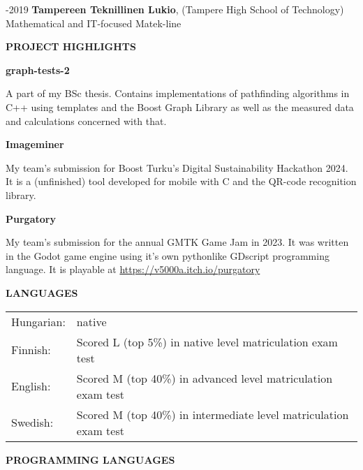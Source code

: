 \documentclass{article}
\begin{document}
-2019 \hspace{1.85cm}\textbf{Tampereen Teknillinen Lukio}, (Tampere High School of Technology) \newline
\hspace*{3.35cm} Mathematical and IT-focused Matek-line \newline

\vspace{1cm}
\textbf{\LARGE PROJECT HIGHLIGHTS}
\vspace{0.5cm}

\textbf{\large graph-tests-2}
\vspace{0.5cm}

\noindent A part of my BSc thesis. Contains implementations of pathfinding 
algorithms in C++ using templates and the Boost Graph Library as well as the 
measured data and calculations concerned with that.

\vspace{0.5cm}
\textbf{\large Imageminer}
\vspace{0.5cm}

\noindent My team's submission for Boost Turku's Digital Sustainability 
Hackathon 2024. It is a (unfinished) tool developed for mobile with C and the 
QR-code recognition library.

\vspace{0.5cm}
\textbf{\large Purgatory}
\vspace{0.5cm}

\noindent My team's submission for the annual GMTK Game Jam in 2023. It was 
written in the Godot game engine using it's own pythonlike GDscript 
programming language. It is playable at 
\href{https://v5000a.itch.io/purgatory}{https://v5000a.itch.io/purgatory}

\vspace{1cm}
\textbf{\LARGE LANGUAGES}
\vspace{0.5cm}

\noindent\begin{tabularx}{\linewidth}{l X}
Hungarian: & native \\
Finnish: & Scored L (top 5\%) in native level matriculation exam test \\
English: & Scored M (top 40\%) in advanced level matriculation exam test \\
Swedish: & Scored M (top 40\%) in intermediate level matriculation exam test \\
\end{tabularx}

\vspace{1cm}
\textbf{\LARGE PROGRAMMING LANGUAGES}
\vspace{0.5cm}
\end{document}
